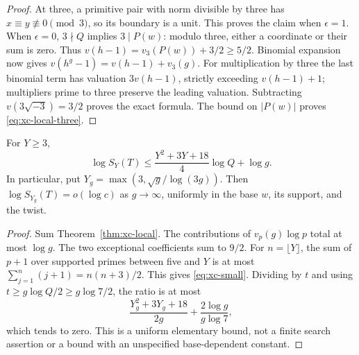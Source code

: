\begin{proof}
At three, a primitive pair with norm divisible by three has
$x\equiv y\not\equiv0\pmod3$, so its boundary is a unit. This proves the
claim when $\epsilon=1$. When $\epsilon=0$, $3\nmid Q$ implies
$3\mid P(w)$: modulo three, either a coordinate or their sum is zero.
Thus $v(h-1)=v_3(P(w))+3/2\ge5/2$.
Binomial expansion now gives $v(h^g-1)=v(h-1)+v_3(g)$.
For multiplication by three the last binomial term has valuation $3v(h-1)$,
strictly exceeding $v(h-1)+1$; multipliers prime to three preserve the
leading valuation. Subtracting $v(3\sqrt{-3})=3/2$ proves the exact formula.
The bound on $|P(w)|$ proves \eqref{eq:xc-local-three}.
\end{proof}

\begin{corollary}\label{cor:xc-small}
For $Y\ge3$,
\begin{equation}\label{eq:xc-small}
 \log S_Y(T)\le
 \frac{Y^2+3Y+18}{4}\log Q+\log g.
\end{equation}
In particular, put $Y_g=\max(3,\sqrt g/\log(3g))$. Then
$\log S_{Y_g}(T)=o(\log c)$ as $g\to\infty$, uniformly in the base $w$,
its support, and the twist.
\end{corollary}
\begin{proof}
Sum Theorem~\ref{thm:xc-local}. The contributions of $v_p(g)\log p$ total
at most $\log g$. The two exceptional coefficients sum to $9/2$.
For $n=\lfloor Y\rfloor$, the sum of $p+1$ over supported primes between
five and $Y$ is at most $\sum_{j=1}^n(j+1)=n(n+3)/2$.
This gives \eqref{eq:xc-small}. Dividing by $t$ and using
$t\ge g\log Q/2\ge g\log7/2$, the ratio is at most
\begin{equation}\label{eq:xc-small-ratio}
 \frac{Y_g^2+3Y_g+18}{2g}+\frac{2\log g}{g\log7},
\end{equation}
which tends to zero. This is a uniform elementary bound, not a finite
search assertion or a bound with an unspecified base-dependent constant.
\end{proof}

